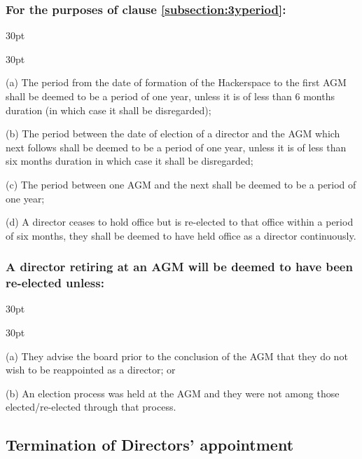 \documentclass[12pt]{article}
\def\clauseindent{30pt}
\newenvironment{subindentlist}{\begin{adjustwidth}{\clauseindent}{}\begin{labeledlist}{\clauseindent}}{\end{labeledlist}\end{adjustwidth}}
\begin{document}
\subsubsection{For the purposes of clause \ref{subsection:3yperiod}:}
\begin{subindentlist}
    \item [(a)] The period from the date of formation of the Hackerspace to the first AGM shall be deemed to be a period of one year, unless it is of less than 6 months duration (in which case it shall be disregarded);
    \item [(b)] The period between the date of election of a director and the AGM which next follows shall be deemed to be a period of one year, unless it is of less than six months duration in which case it shall be disregarded;
    \item [(c)] The period between one AGM and the next shall be deemed to be a period of one year;
    \item [(d)] A director ceases to hold office but is re-elected to that office within a period of six months, they shall be deemed to have held office as a director continuously.
\end{subindentlist}
\subsubsection{A director retiring at an AGM will be deemed to have been re-elected unless:}
\begin{subindentlist}
    \item [(a)] They advise the board prior to the conclusion of the AGM that they do not wish to
be reappointed as a director; or
    \item [(b)] An election process was held at the AGM and they were not among those elected/re-elected through that process.
\end{subindentlist}

\subsection{Termination of Directors' appointment}
\end{document}
